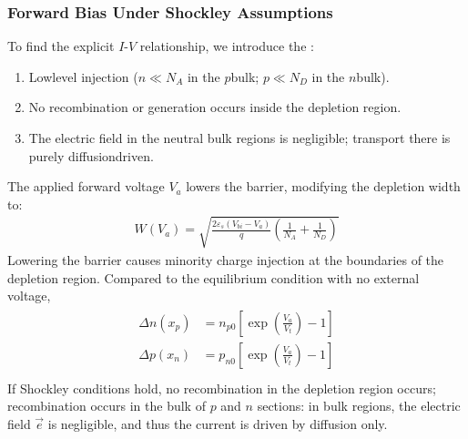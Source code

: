 \documentclass[letterpaper,10pt,english]{jupyterBook}
\begin{document}
\subsubsection{Forward Bias Under Shockley Assumptions}
\label{\detokenize{ch/solid-state/semiconductors-pn-junctions:forward-bias-under-shockley-assumptions}}\label{\detokenize{ch/solid-state/semiconductors-pn-junctions:semiconductors-pn-junctions-depletion-approximation-fwd-bias}}
\sphinxAtStartPar
To find the explicit \(I\text{-}V\) relationship, we introduce the :
\begin{enumerate}
%
\item {} 
\sphinxAtStartPar
Low\sphinxhyphen{}level injection (\(n \ll N_A\) in the \(p\)\sphinxhyphen{}bulk; \(p \ll N_D\) in the \(n\)\sphinxhyphen{}bulk).

\item {} 
\sphinxAtStartPar
No recombination or generation occurs inside the depletion region.

\item {} 
\sphinxAtStartPar
The electric field in the neutral bulk regions is negligible; transport there is purely diffusion\sphinxhyphen{}driven.

\end{enumerate}

\sphinxAtStartPar
{}
The applied forward voltage \(V_a\) lowers the barrier, modifying the depletion width to:
\begin{equation*}
\begin{split}W(V_a) = \sqrt{\frac{2\varepsilon_s (V_{bi} - V_a)}{q} \left( \frac{1}{N_A} + \frac{1}{N_D} \right)}\end{split}
\end{equation*}
\sphinxAtStartPar
{} Lowering the barrier causes minority charge injection at the boundaries of the depletion region. Compared to the equilibrium condition with no external voltage,
\begin{equation*}
\begin{split}\begin{aligned}
  \Delta n(x_p) & = n_{p0} \left[ \exp\left( \frac{V_a}{V_t} \right) - 1 \right] \\
  \Delta p(x_n) & = p_{n0} \left[ \exp\left( \frac{V_a}{V_t} \right) - 1 \right] \\
\end{aligned}\end{split}
\end{equation*}
\sphinxAtStartPar
{} If Shockley conditions hold, no recombination in the depletion region occurs; recombination occurs in the bulk of \(p\)\sphinxhyphen{} and \(n\)\sphinxhyphen{} sections: in bulk regions, the electric field \(\vec{e}\) is negligible, and thus the current is driven by diffusion only.
\end{document}
